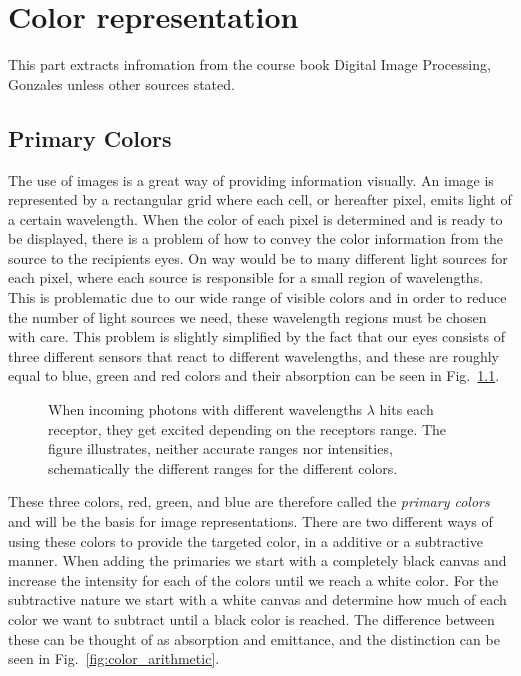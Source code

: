 \chapter{Color representation}
\label{chap:color_rep}

This part extracts infromation from the course book Digital Image Processing, Gonzales \cite{diProcessing} unless other sources stated.


\section{Primary Colors}

The use of images is a great way of providing information visually. An image is represented by a rectangular grid where each cell, or hereafter pixel, emits light of a certain wavelength. When the color of each pixel is determined and is ready to be displayed, there is a problem of how to convey the color information from the source to the recipients eyes. On way would be to many different light sources for each pixel, where each source is responsible for a small region of wavelengths. This is problematic due to our wide range of visible colors and in order to reduce the number of light sources we need, these wavelength regions must be chosen with care. This problem is slightly simplified by the fact that our eyes consists of three different sensors that react to different wavelengths, and these are roughly equal to blue, green and red colors and their absorption can be seen in Fig.~\ref{fig:colorAbsorption}.

\begin{figure}[h]
    \centering
    \resizebox{0.49\textwidth}{!}{
        
    }
    \caption{\label{fig:colorAbsorption}When incoming photons with different wavelengths $\lambda$ hits each receptor, they get excited depending on the receptors range. The figure illustrates, neither accurate ranges nor intensities, schematically the different ranges for the different colors. }
\end{figure}

These three colors, red, green, and blue are therefore called the \textit{primary colors} and will be the basis for image representations. There are two different ways of using these colors to provide the targeted color, in a additive or a subtractive manner. When adding the primaries we start with a completely black canvas and increase the intensity for each of the colors until we reach a white color. For the subtractive nature we start with a white canvas and determine how much of each color we want to subtract until a black color is reached. The difference between these can be thought of as absorption and emittance, and the distinction can be seen in Fig.~\ref{fig:color_arithmetic}.

